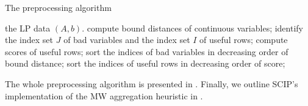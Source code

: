 \documentclass[a4paper,UKenglish,cleveref, autoref,  thm-restate]{lipics-v2021}
\begin{document}
	
	\begin{algorithm}
		\caption{The preprocessing algorithm}
		\begin{algorithmic}[1]
			\Require the LP data $(A,b)$.
			\State compute bound distances of continuous variables;
			\State identify the index set $J$ of bad variables and the index set $I$ of useful rows;
			\State compute scores of useful rows;
			\State sort the indices of bad variables in decreasing order of bound distance;
			\State sort the indices of useful rows in decreasing order of score;
		\end{algorithmic}
		\label{algo.prep}
	\end{algorithm}
	
	
	
	
	
	
	
	
	The whole preprocessing algorithm is presented in . Finally, we outline SCIP's implementation of the MW aggregation heuristic in . %
	
	
	
\end{document}
